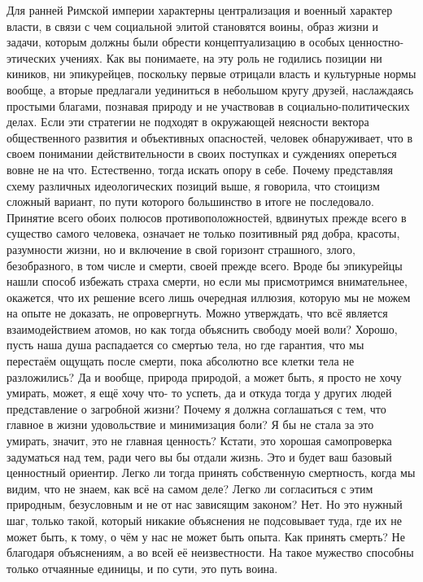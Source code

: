 Для
ранней Римской империи характерны централизация и военный характер власти, в
связи с чем социальной элитой становятся воины, образ жизни и задачи, которым
должны были обрести концептуализацию в особых ценностно-этических учениях. Как
вы понимаете, на эту роль не годились позиции ни киников, ни эпикурейцев,
поскольку первые отрицали власть и культурные нормы вообще, а вторые предлагали
уединиться в небольшом кругу друзей, наслаждаясь простыми благами, познавая
природу и не участвовав в социально-политических делах. Если эти стратегии не
подходят в окружающей неясности вектора общественного развития и объективных
опасностей, человек обнаруживает, что в своем понимании действительности в своих
поступках и суждениях опереться вовне не на что. Естественно, тогда искать опору
в себе. Почему представляя схему различных идеологических позиций выше, я
говорила, что стоицизм сложный вариант, по пути которого большинство в итоге не
последовало. Принятие всего обоих полюсов противоположностей, вдвинутых прежде
всего в существо самого человека, означает не только позитивный ряд добра,
красоты, разумности жизни, но и включение в свой горизонт страшного, злого,
безобразного, в том числе и смерти, своей прежде всего. Вроде бы эпикурейцы
нашли способ избежать страха смерти, но если мы присмотримся внимательнее,
окажется, что их решение всего лишь очередная иллюзия, которую мы не можем на
опыте не доказать, не опровергнуть. Можно утверждать, что всё является
взаимодействием атомов, но как тогда объяснить свободу моей воли? Хорошо, пусть
наша душа распадается со смертью тела, но где гарантия, что мы перестаём ощущать
после смерти, пока абсолютно все клетки тела не разложились? Да и вообще,
природа природой, а может быть, я просто не хочу умирать, может, я ещё хочу что-
то успеть, да и откуда тогда у других людей представление о загробной жизни?
Почему я должна соглашаться с тем, что главное в жизни удовольствие и
минимизация боли? Я бы не стала за это умирать, значит, это не главная ценность?
Кстати, это хорошая самопроверка задуматься над тем, ради чего вы бы отдали
жизнь. Это и будет ваш базовый ценностный ориентир. Легко ли тогда принять
собственную смертность, когда мы видим, что не знаем, как всё на самом деле?
Легко ли согласиться с этим природным, безусловным и не от нас зависящим
законом? Нет. Но это нужный шаг, только такой, который никакие объяснения не
подсовывает туда, где их не может быть, к тому, о чём у нас не может быть опыта.
Как принять смерть? Не благодаря объяснениям, а во всей её неизвестности. На
такое мужество способны только отчаянные единицы, и по сути, это путь воина.

